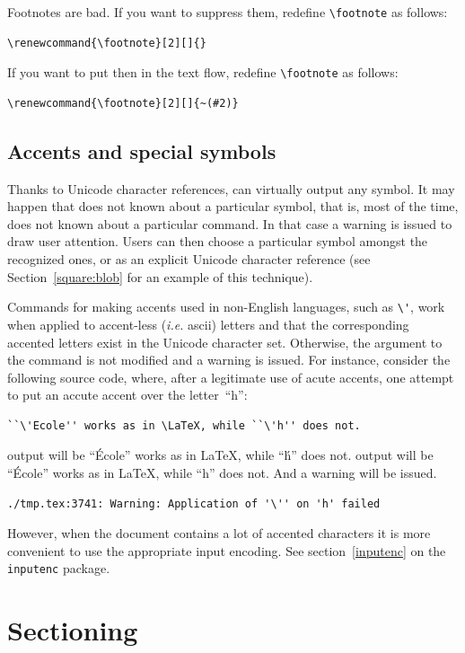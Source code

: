 Footnotes are bad.
If you want to suppress them, redefine \verb+\footnote+ as follows:
\begin{verbatim}
\renewcommand{\footnote}[2][]{}
\end{verbatim}
If you want to put then in the text flow,  redefine \verb+\footnote+
as follows:
\begin{verbatim}
\renewcommand{\footnote}[2][]{~(#2)}
\end{verbatim}

\subsection{Accents\label{accents} and special symbols}
Thanks to Unicode character references, \hevea{} can virtually output
any symbol.
It may happen that \hevea{} does not known about a particular symbol,
that is, most of the time, \hevea{} does not known about a particular
command. In that case a warning is issued to draw user attention.
Users can then choose a particular symbol amongst the recognized ones,
or as an explicit Unicode character reference (see
Section~\ref{square:blob} for an example of this technique).

Commands for making accents used in non-English languages, such as
\verb+\'+, work when applied to accent-less (\emph{i.e.} ascii)
letters and that the corresponding accented letters exist
in the Unicode character set.
Otherwise, the argument to the command is not modified
and a warning is issued.
For instance, consider the following source code, where, after a
legitimate use of acute accents, one attempt to put an accute accent
over the letter~``h'':
\begin{verbatim}
``\'Ecole'' works as in \LaTeX, while ``\'h'' does not.
\end{verbatim}
\ifhevea
\hevea{} output will be ``\'Ecole'' works as in \LaTeX, while ``\'h'' does not.
\else
\hevea{} output will  be ``\'Ecole'' works as in \LaTeX, while ``h'' does not.
\fi{}
And a warning will be issued.
\begin{verbatim}
./tmp.tex:3741: Warning: Application of '\'' on 'h' failed
\end{verbatim}

However, when the document contains a lot of accented characters it is
more convenient to use the appropriate input encoding. See
section~\ref{inputenc} on the \texttt{inputenc} package.

\section{Sectioning}

